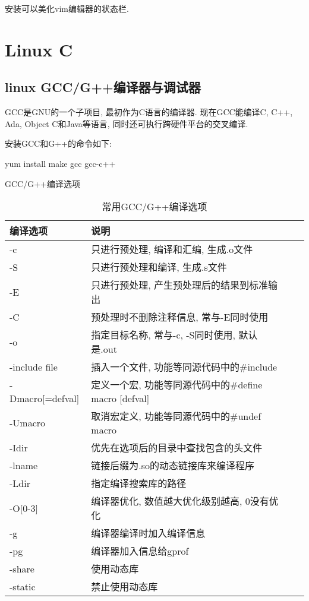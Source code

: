 安装可以美化vim编辑器的状态栏.

\section{Linux C}


\subsection{linux GCC/G++编译器与调试器}
GCC是GNU的一个子项目, 最初作为C语言的编译器. 现在GCC能编译C, 
C++, Ada, Object C和Java等语言, 同时还可执行跨硬件平台的交叉编译.

安装GCC和G++的命令如下:
\begin{shell}
 yum install make gcc gcc-c++
\end{shell}

GCC/G++编译选项
\begin{table}[H]
\small %
\sffamily %
\centering %
\renewcommand{\arraystretch}{1.4} %
\caption{常用GCC/G++编译选项}
\begin{tabular}{*{2}{l|l}}
 \hline
 \bfseries 编译选项 & \bfseries 说明 \\
 \hline
 -c & 只进行预处理, 编译和汇编, 生成.o文件\\
 \hline
 -S & 只进行预处理和编译, 生成.s文件\\
 \hline
 -E & 只进行预处理, 产生预处理后的结果到标准输出\\
 \hline
 -C & 预处理时不删除注释信息, 常与-E同时使用\\
 \hline
 -o & 指定目标名称, 常与-c, -S同时使用, 默认是.out\\
 \hline
 -include file & 插入一个文件, 功能等同源代码中的\#include\\
 \hline
 -Dmacro[=defval] & 定义一个宏, 功能等同源代码中的\#define macro [defval]\\
 \hline
 -Umacro & 取消宏定义, 功能等同源代码中的\#undef macro\\
 \hline
 -Idir & 优先在选项后的目录中查找包含的头文件\\
 \hline
 -lname & 链接后缀为.so的动态链接库来编译程序\\
 \hline
 -Ldir & 指定编译搜索库的路径\\
 \hline
 -O[0-3] & 编译器优化, 数值越大优化级别越高, 0没有优化\\
 \hline
 -g & 编译器编译时加入编译信息\\
 \hline
 -pg & 编译器加入信息给gprof\\
 \hline
 -share & 使用动态库\\
 \hline
 -static & 禁止使用动态库\\
 \hline
\end{tabular}
\end{table}

